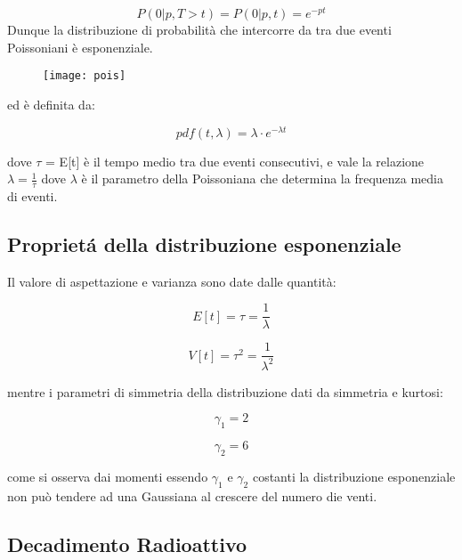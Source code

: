 \documentclass[11pt,a4paper]{book}
\begin{document}
\begin{equation*}
	P(0 \vert p, T>t) = P(0 \vert p, t) = e^{-pt}
\end{equation*}
 Dunque la distribuzione di probabilit\`{a} che intercorre da tra due eventi Poissoniani \`{e} esponenziale.
\begin{figure}[ht]
\vspace{0.2in}
\texttt{[image: pois]}	
\centering
\vspace{0.2in}
\end{figure}

ed \`{e} definita da:

\begin{equation}
	pdf(t,\lambda) = \lambda \cdot e^{-\lambda t}
\end{equation}

dove $\tau$ = E[t] \`{e} il tempo medio tra due eventi consecutivi, e vale la relazione $\lambda = \frac{1}{\tau}$ dove $\lambda$ \`{e} il parametro della Poissoniana che determina la frequenza media di eventi. 

\subsection{Propriet\'{a} della distribuzione esponenziale}

Il valore di aspettazione e varianza sono date dalle quantit\`{a}:

\begin{equation}
	E[t] = \tau = \dfrac{1}{\lambda}
\end{equation}

\begin{equation}
	V[t] = \tau^2 = \dfrac{1}{\lambda^2}
\end{equation}

mentre i parametri di simmetria della distribuzione dati da simmetria e kurtosi:

\begin{equation}
	\gamma_1 = 2
\end{equation}

\begin{equation}
	\gamma_2 = 6
\end{equation}

come si osserva dai momenti essendo $\gamma_1$ e $\gamma_2$ costanti la distribuzione esponenziale non pu\`{o} tendere ad una Gaussiana al crescere del numero die venti.

\subsection{Decadimento Radioattivo}
\end{document}
